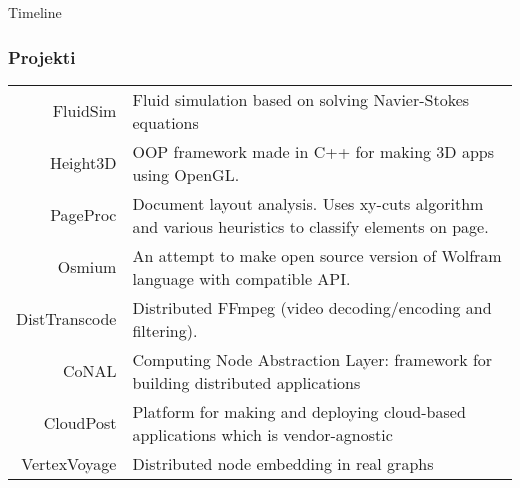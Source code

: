 \documentclass{beamer}
\newcommand{\drawperiod}[6]{%
  \pgfmathsetmacro{\startx}{1.25*#1 + 1.25*(#2-1)/12 - 1.25*2016} %
  \pgfmathsetmacro{\endx}{1.25*#3 + 1.25*(#4-1)/12 - 1.25*2016}   %
  \draw[fill=#5] (\startx,0.4) rectangle (\endx,1.2); %
  \node at ({(\startx+\endx)/2}, 0.8) {\texttt{[image: \#6]}}; %
  \draw [dashed] (\startx,0.4) -- (\startx,0);
  \draw [dashed] (\endx,0.4) -- (\endx,0);
}
\newcommand{\drawperiodabove}[6]{%
  \pgfmathsetmacro{\startx}{1.25*#1 + 1.25*(#2-1)/12 - 1.25*2016} %
  \pgfmathsetmacro{\endx}{1.25*#3 + 1.25*(#4-1)/12 - 1.25*2016}   %
  \draw[fill=#5] (\startx,2.0) rectangle (\endx,2.8); %
  \node at ({(\startx+\endx)/2}, 2.4) {\texttt{[image: \#6]}}; %
  \draw [dashed] (\startx,2.0) -- (\startx,0);
  \draw [dashed] (\endx,2.0) -- (\endx,0);
}
\newcommand{\drawperiodbelow}[6]{%
  \pgfmathsetmacro{\startx}{1.25*#1 + 1.25*(#2-1)/12 - 1.25*2016} %
  \pgfmathsetmacro{\endx}{1.25*#3 + 1.25*(#4-1)/12 - 1.25*2016}   %
  \draw[fill=#5] (\startx,-1.0) rectangle (\endx,-1.8); %
  \node at ({(\startx+\endx)/2}, -1.4) {\texttt{[image: \#6]}}; %
  \draw [dashed] (\startx,-1.2) -- (\startx,0);
  \draw [dashed] (\endx,-1.2) -- (\endx,0);
}
\begin{document}
\begin{frame}{Timeline}


\end{frame}

\begin{frame}
  \frametitle{Projekti}
  \begin{tabular}{r|p{8cm}}


    
    FluidSim & Fluid simulation based on solving Navier-Stokes equations \\
    Height3D & OOP framework made in C++ for making 3D apps using OpenGL. \\
    PageProc & Document layout analysis. Uses xy-cuts algorithm and various heuristics to classify elements on page.  \\ 
    Osmium & An attempt to make open source version of Wolfram language with compatible API. \\
    DistTranscode & Distributed FFmpeg (video decoding/encoding and filtering). \\
    CoNAL & Computing Node Abstraction Layer: framework for building distributed applications  \\
    CloudPost & Platform for making and deploying cloud-based applications which is vendor-agnostic \\
    VertexVoyage & Distributed node embedding in real graphs \\
    \end{tabular}
    
  

\end{frame}
\end{document}
